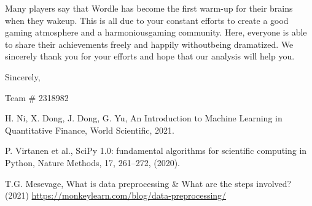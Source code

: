 \documentclass[12pt]{article}  %
\begin{document}
 \noindent Many players say that Wordle has become the first warm-up for their brains when they wakeup. This is all due to your constant efforts to create a good gaming atmosphere and a harmoniousgaming community. Here, everyone is able to share their achievements freely and happily withoutbeing dramatized. We sincerely thank you for your efforts and hope that our analysis will help you.
 
 \hfill Sincerely,
 
 \hfill Team \# 2318982
 
 \clearpage   %
 
 \begin{thebibliography}{99}
     
   H. Ni, X. Dong, J. Dong, G. Yu, An Introduction to Machine Learning in Quantitative Finance, World Scientific, 2021.
   
   P. Virtanen et al., SciPy 1.0: fundamental algorithms for scientific computing in
   Python, Nature Methods, 17, 261--272, (2020).
   
   T.G. Mesevage, What is data preprocessing \& What are the steps involved? (2021) \href{https://monkeylearn.com/blog/data-preprocessing/}{https://monkeylearn.com/blog/data-preprocessing/}
 \end{thebibliography}
 
 
 
\end{document}
